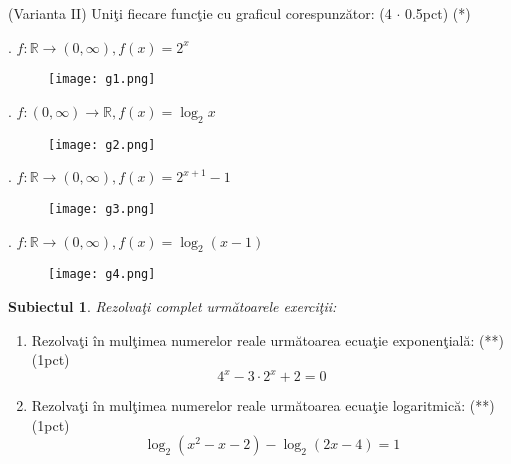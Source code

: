 \documentclass[a4paper, 12pt]{scrartcl}
\theoremstyle{plain}
\newtheorem{subiect}{Subiectul}
\newcommand{\Subiect}[1]{
    {
        \large
        \begin{subiect}
            #1
        \end{subiect}
    }
}
\begin{document}
\newpage
\noindent (Varianta II) Uni\c ti fiecare func\c tie cu graficul corespunz\u ator: (4 \(\cdot\) 0.5pct) \hfill (*)


\begin{paracol}{2}
    . \( f: \mathbb{R} \rightarrow ( 0, \infty ),  f(x) = 2^x \)
    \switchcolumn
    \begin{figure}
        \texttt{[image: g1.png]}
    \end{figure}
\end{paracol}

\begin{paracol}{2}
    . \( f: ( 0, \infty ) \rightarrow \mathbb{R}, f(x) = \log_2{x} \)
    \switchcolumn
    \begin{figure}
        \texttt{[image: g2.png]}
    \end{figure}
\end{paracol}
    
\begin{paracol}{2}
    . \( f: \mathbb{R} \rightarrow ( 0, \infty ), f(x) = 2^{x+1} - 1 \)
    \switchcolumn
    \begin{figure}
        \texttt{[image: g3.png]}
    \end{figure}
\end{paracol}

\begin{paracol}{2}
    . \( f: \mathbb{R} \rightarrow ( 0, \infty ), f(x) = \log_2({x - 1}) \)
    \switchcolumn
    \begin{figure}[h]
        \texttt{[image: g4.png]}
    \end{figure}
\end{paracol}

\newpage

\Subiect{Rezolva\c ti complet urm\u atoarele exerci\c tii:}

\begin{enumerate}[label=\textbf{\arabic*})]
    \item {
        Rezolva\c ti \^in mul\c timea numerelor reale urm\u atoarea ecua\c tie exponen\c tial\u a: (**) \hfill (1pct)
        \[
            4^x - 3 \cdot 2^x + 2 = 0
        \]    
    }
    \item {
        Rezolva\c ti \^in mul\c timea numerelor reale urm\u atoarea ecua\c tie logaritmic\u a: (**) \hfill (1pct)
        \[
            \log_2 (x^2 - x - 2) - \log_2 (2x - 4) = 1
        \]    
    }
\end{enumerate}
\end{document}

